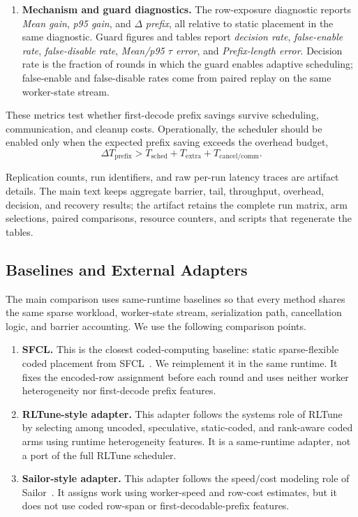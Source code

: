 \begin{enumerate}
as SFCL in the stress table.  \emph{Err.} is closed-worker errors per round, and
\emph{Recov.} is bounded row reissues per round.
\item \textbf{Mechanism and guard diagnostics.}  The row-exposure diagnostic
reports \emph{Mean gain}, \emph{p95 gain}, and $\Delta$ \emph{prefix}, all
relative to static placement in the same diagnostic.  Guard figures and tables
report \emph{decision rate}, \emph{false-enable rate}, \emph{false-disable
rate}, \emph{Mean/p95 $\tau$ error}, and \emph{Prefix-length error}.  Decision
rate is the fraction of rounds in which the guard enables adaptive scheduling;
false-enable and false-disable rates come from paired replay on the same
worker-state stream.
\end{enumerate}

These metrics test whether first-decode prefix savings survive scheduling,
communication, and cleanup costs.  Operationally, the scheduler should be
enabled only when the expected prefix saving exceeds the overhead budget,
\[
  \Delta T_{\mathrm{prefix}} >
  T_{\mathrm{sched}} + T_{\mathrm{extra}} + T_{\mathrm{cancel/comm}} .
\]

Replication counts, run identifiers, and raw per-run latency traces are
artifact details.  The main text keeps aggregate barrier, tail, throughput,
overhead, decision, and recovery results; the artifact retains the complete run
matrix, arm selections, paired comparisons, resource counters, and scripts that
regenerate the tables.

\subsection{Baselines and External Adapters}

The main comparison uses same-runtime baselines so that every method shares the
same sparse workload, worker-state stream, serialization path, cancellation
logic, and barrier accounting.  We use the following comparison points.
\begin{enumerate}
\setlength{\itemsep}{2pt}
\item \textbf{SFCL.}  This is the closest coded-computing baseline: static
sparse-flexible coded placement from SFCL~\cite{zhang2025sparseflexible}.  We
reimplement it in the same runtime.  It fixes the encoded-row assignment before
each round and uses neither worker heterogeneity nor first-decode prefix
features.
\item \textbf{RLTune-style adapter.}  This adapter follows the systems role of
RLTune~\cite{dongare2025rltune} by selecting among uncoded, speculative,
static-coded, and rank-aware coded arms using runtime heterogeneity features.
It is a same-runtime adapter, not a port of the full RLTune scheduler.
\item \textbf{Sailor-style adapter.}  This adapter follows the speed/cost
modeling role of Sailor~\cite{strati2025sailor}.  It assigns work using
worker-speed and row-cost estimates, but it does not use coded row-span or
first-decodable-prefix features.
\end{enumerate}

